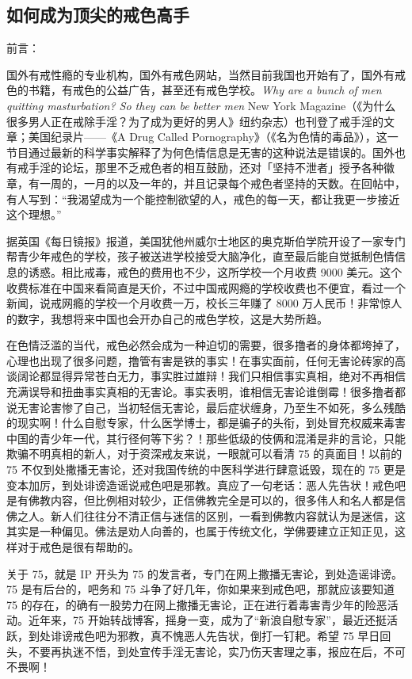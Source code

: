 \subsection{如何成为顶尖的戒色高手}

前言：

国外有戒性瘾的专业机构，国外有戒色网站，当然目前我国也开始有了，国外有戒色的书籍，有戒色的公益广告，甚至还有戒色学校。\textit{Why are a bunch of men quitting masturbation? So they can be better men} New York Magazine（《为什么很多男人正在戒除手淫？为了成为更好的男人》纽约杂志）也刊登了戒手淫的文章；美国纪录片——《A Drug Called Pornography》（《名为色情的毒品》），这一节目通过最新的科学事实解释了为何色情信息是无害的这种说法是错误的。国外也有戒手淫的论坛，那里不乏戒色者的相互鼓励，还对「坚持不泄者」授予各种徽章，有一周的，一月的以及一年的，并且记录每个戒色者坚持的天数。在回帖中，有人写到：“我渴望成为一个能控制欲望的人，戒色的每一天，都让我更一步接近这个理想。”

据英国《每日镜报》报道，美国犹他州威尔士地区的奥克斯伯学院开设了一家专门帮青少年戒色的学校，孩子被送进学校接受大脑净化，直至最后能自觉抵制色情信息的诱惑。相比戒毒，戒色的费用也不少，这所学校一个月收费 9000 美元。这个收费标准在中国来看简直是天价，不过中国戒网瘾的学校收费也不便宜，看过一个新闻，说戒网瘾的学校一个月收费一万，校长三年赚了 8000 万人民币！非常惊人的数字，我想将来中国也会开办自己的戒色学校，这是大势所趋。

在色情泛滥的当代，戒色必然会成为一种迫切的需要，很多撸者的身体都垮掉了，心理也出现了很多问题，撸管有害是铁的事实！在事实面前，任何无害论砖家的高谈阔论都显得异常苍白无力，事实胜过雄辩！我们只相信事实真相，绝对不再相信充满误导和扭曲事实真相的无害论。事实表明，谁相信无害论谁倒霉！很多撸者都说无害论害惨了自己，当初轻信无害论，最后症状缠身，乃至生不如死，多么残酷的现实啊！什么自慰专家，什么医学博士，都是骗子的头衔，到处冒充权威来毒害中国的青少年一代，其行径何等下劣？！那些低级的伎俩和混淆是非的言论，只能欺骗不明真相的新人，对于资深戒友来说，一眼就可以看清 75 的真面目！以前的 75 不仅到处撒播无害论，还对我国传统的中医科学进行肆意诋毁，现在的 75 更是变本加厉，到处诽谤造谣说戒色吧是邪教。真应了一句老话：恶人先告状！戒色吧是有佛教内容，但比例相对较少，正信佛教完全是可以的，很多伟人和名人都是信佛之人。新人们往往分不清正信与迷信的区别，一看到佛教内容就认为是迷信，这其实是一种偏见。佛法是劝人向善的，也属于传统文化，学佛要建立正知正见，这样对于戒色是很有帮助的。

关于 75，就是 IP 开头为 75 的发言者，专门在网上撒播无害论，到处造谣诽谤。75 是有后台的，吧务和 75 斗争了好几年，你如果来到戒色吧，那就应该要知道 75 的存在，的确有一股势力在网上撒播无害论，正在进行着毒害青少年的险恶活动。近年来，75 开始转战博客，摇身一变，成为了“新浪自慰专家”，最近还挺活跃，到处诽谤戒色吧为邪教，真不愧恶人先告状，倒打一钉耙。希望 75 早日回头，不要再执迷不悟，到处宣传手淫无害论，实乃伤天害理之事，报应在后，不可不畏啊！

